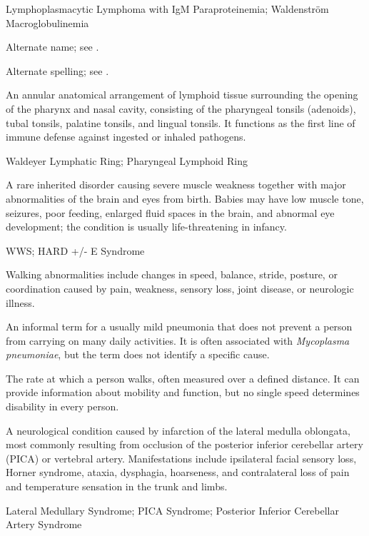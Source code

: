 \synonyms
Lymphoplasmacytic Lymphoma with IgM Paraproteinemia; Waldenström Macroglobulinemia

 Alternate name; see .

 Alternate spelling; see .

 An annular anatomical arrangement of lymphoid tissue surrounding the opening of the pharynx and nasal cavity, consisting of the pharyngeal tonsils (adenoids), tubal tonsils, palatine tonsils, and lingual tonsils. It functions as the first line of immune defense against ingested or inhaled pathogens.

\synonyms
Waldeyer Lymphatic Ring; Pharyngeal Lymphoid Ring

 A rare inherited disorder causing severe muscle weakness together with major abnormalities of the brain and eyes from birth. Babies may have low muscle tone, seizures, poor feeding, enlarged fluid spaces in the brain, and abnormal eye development; the condition is usually life-threatening in infancy.

\synonyms
WWS; HARD +/- E Syndrome

 Walking abnormalities include changes in speed, balance, stride, posture, or coordination caused by pain, weakness, sensory loss, joint disease, or neurologic illness.

 An informal term for a usually mild pneumonia that does not prevent a person from carrying on many daily activities. It is often associated with \textit{Mycoplasma pneumoniae}, but the term does not identify a specific cause.

 The rate at which a person walks, often measured over a defined distance. It can provide information about mobility and function, but no single speed determines disability in every person.

 A neurological condition caused by infarction of the lateral medulla oblongata, most commonly resulting from occlusion of the posterior inferior cerebellar artery (PICA) or vertebral artery. Manifestations include ipsilateral facial sensory loss, Horner syndrome, ataxia, dysphagia, hoarseness, and contralateral loss of pain and temperature sensation in the trunk and limbs.

\synonyms
Lateral Medullary Syndrome; PICA Syndrome; Posterior Inferior Cerebellar Artery Syndrome

